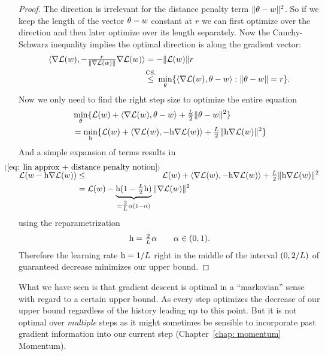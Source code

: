 \begin{proof}
	The direction is irrelevant for the distance penalty term \(\|\theta-w\|^2\).
	So if we keep the length of the vector \(\theta-w\) constant at \(r\)
	we can first optimize over the direction and then later optimize over its
	length separately. Now the Cauchy-Schwarz inequality implies the optimal
	direction is along the gradient vector:
	\begin{align*}
		\langle \nabla\Loss(\weights),-\tfrac{r}{\|\nabla\Loss(\weights)\|}\nabla\Loss(\weights)\rangle
		&= - \|\Loss(\weights)\| r\\
		&\lxle{\text{CS.}}
		\min_{\theta} \{\langle \nabla \Loss(\weights), \theta-\weights \rangle : \|\theta-\weights\|=r \}.
	\end{align*}
	Now we only need to find the right step size to optimize the entire equation
	\begin{align*}
		&\min_{\theta} \{
			\mathcal{L}(w)+ \langle\nabla \mathcal{L}(w), \theta-w\rangle
			+ \tfrac{L}{2}\|\theta-w\|^2 
		\} \\
		&= \min_{\text{h}} \{ \mathcal{L}(w) + \langle \nabla \mathcal{L}(w), -\text{h} \nabla \mathcal{L}(w)\rangle
		+ \tfrac{L}{2}\|\text{h}\nabla \mathcal{L}(w)\|^2\}
	\end{align*}
	And a simple expansion of terms results in
	\begin{align*}
		\Loss(\weights-\lr\nabla\Loss(\weights))
		&\lxle{(\ref{eq: lin approx + distance penalty notion})}
		\Loss(\weights) + \langle \nabla \Loss(\weights), -\lr \nabla \Loss(\weights)\rangle
		+ \tfrac{\ubound}{2}\|\lr\nabla \Loss(\weights)\|^2\\
		&=\Loss(\weights) - \underbrace{\lr(1-\tfrac{\ubound}2\lr)}_{=\tfrac{2}{\ubound}\alpha(1-\alpha)}\|\nabla\Loss(\weights)\|^2
	\end{align*}
	using the reparametrization
	\begin{align*}
		\text{h}=\tfrac{2}{L}\alpha\qquad \alpha \in (0,1).
	\end{align*}
	Therefore the learning rate \(\text{h}=1/L\) right in the middle of the
	interval \((0, 2/L)\) of guaranteed decrease minimizes our upper bound.
\end{proof}
\begin{remark}
	What we have seen is that gradient descent is optimal in a ``markovian''
	sense with regard to a certain upper bound. As every step optimizes the
	decrease of our upper bound regardless of the history leading up to this
	point. But it is not optimal over \emph{multiple} steps as it might sometimes
	be sensible to incorporate past gradient information into our current step
	(Chapter~\ref{chap: momentum} Momentum).
\end{remark}


